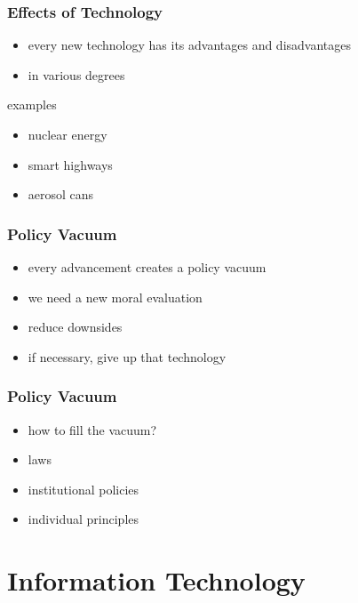\documentclass[dvipsnames]{beamer}
\theoremstyle{plain}
\begin{document}
\begin{frame}
  \frametitle{Effects of Technology}

  \begin{itemize}
    \item every new technology has its advantages and disadvantages
    \item in various degrees
  \end{itemize}

  \begin{exampleblock}{examples}
    \begin{itemize}
      \item nuclear energy
      \item smart highways
      \item aerosol cans
    \end{itemize}
  \end{exampleblock}
\end{frame}

\begin{frame}
  \frametitle{Policy Vacuum}

  \begin{itemize}
    \item every advancement creates a policy vacuum

    \bigskip
    \item we need a new moral evaluation
    \item reduce downsides
    \item if necessary, give up that technology
  \end{itemize}
\end{frame}

\begin{frame}
  \frametitle{Policy Vacuum}

  \begin{itemize}
    \item how to fill the vacuum?

    \bigskip
    \item laws
    \item institutional policies
    \item individual principles
  \end{itemize}
\end{frame}

\section{Information Technology}
\end{document}
